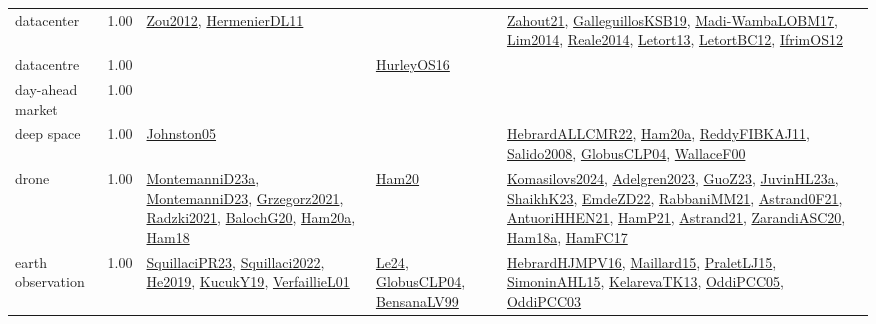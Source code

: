 {\begin{longtable}{p{3cm}r>{\raggedright\arraybackslash}p{6cm}>{\raggedright\arraybackslash}p{6cm}>{\raggedright\arraybackslash}p{8cm}}
\index{datacenter}\index{ApplicationAreas!datacenter}datacenter &  1.00 & \hyperref[detail:Zou2012]{Zou2012}, \hyperref[detail:HermenierDL11]{HermenierDL11} &  & \hyperref[detail:Zahout21]{Zahout21}, \hyperref[detail:GalleguillosKSB19]{GalleguillosKSB19}, \hyperref[detail:Madi-WambaLOBM17]{Madi-WambaLOBM17}, \hyperref[detail:Lim2014]{Lim2014}, \hyperref[detail:Reale2014]{Reale2014}, \hyperref[detail:Letort13]{Letort13}, \hyperref[detail:LetortBC12]{LetortBC12}, \hyperref[detail:IfrimOS12]{IfrimOS12}\\
\index{datacentre}\index{ApplicationAreas!datacentre}datacentre &  1.00 &  & \hyperref[detail:HurleyOS16]{HurleyOS16} & \\
\index{day-ahead market}\index{ApplicationAreas!day-ahead market}day-ahead market &  1.00 &  &  & \\
\index{deep space}\index{ApplicationAreas!deep space}deep space &  1.00 & \hyperref[detail:Johnston05]{Johnston05} &  & \hyperref[detail:HebrardALLCMR22]{HebrardALLCMR22}, \hyperref[detail:Ham20a]{Ham20a}, \hyperref[detail:ReddyFIBKAJ11]{ReddyFIBKAJ11}, \hyperref[detail:Salido2008]{Salido2008}, \hyperref[detail:GlobusCLP04]{GlobusCLP04}, \hyperref[detail:WallaceF00]{WallaceF00}\\
\index{drone}\index{ApplicationAreas!drone}drone &  1.00 & \hyperref[detail:MontemanniD23a]{MontemanniD23a}, \hyperref[detail:MontemanniD23]{MontemanniD23}, \hyperref[detail:Grzegorz2021]{Grzegorz2021}, \hyperref[detail:Radzki2021]{Radzki2021}, \hyperref[detail:BalochG20]{BalochG20}, \hyperref[detail:Ham20a]{Ham20a}, \hyperref[detail:Ham18]{Ham18} & \hyperref[detail:Ham20]{Ham20} & \hyperref[detail:Komasilovs2024]{Komasilovs2024}, \hyperref[detail:Adelgren2023]{Adelgren2023}, \hyperref[detail:GuoZ23]{GuoZ23}, \hyperref[detail:JuvinHL23a]{JuvinHL23a}, \hyperref[detail:ShaikhK23]{ShaikhK23}, \hyperref[detail:EmdeZD22]{EmdeZD22}, \hyperref[detail:RabbaniMM21]{RabbaniMM21}, \hyperref[detail:Astrand0F21]{Astrand0F21}, \hyperref[detail:AntuoriHHEN21]{AntuoriHHEN21}, \hyperref[detail:HamP21]{HamP21}, \hyperref[detail:Astrand21]{Astrand21}, \hyperref[detail:ZarandiASC20]{ZarandiASC20}, \hyperref[detail:Ham18a]{Ham18a}, \hyperref[detail:HamFC17]{HamFC17}\\
\index{earth observation}\index{ApplicationAreas!earth observation}earth observation &  1.00 & \hyperref[detail:SquillaciPR23]{SquillaciPR23}, \hyperref[detail:Squillaci2022]{Squillaci2022}, \hyperref[detail:He2019]{He2019}, \hyperref[detail:KucukY19]{KucukY19}, \hyperref[detail:VerfaillieL01]{VerfaillieL01} & \hyperref[detail:Le24]{Le24}, \hyperref[detail:GlobusCLP04]{GlobusCLP04}, \hyperref[detail:BensanaLV99]{BensanaLV99} & \hyperref[detail:HebrardHJMPV16]{HebrardHJMPV16}, \hyperref[detail:Maillard15]{Maillard15}, \hyperref[detail:PraletLJ15]{PraletLJ15}, \hyperref[detail:SimoninAHL15]{SimoninAHL15}, \hyperref[detail:KelarevaTK13]{KelarevaTK13}, \hyperref[detail:OddiPCC05]{OddiPCC05}, \hyperref[detail:OddiPCC03]{OddiPCC03}\\

\end{longtable}}
